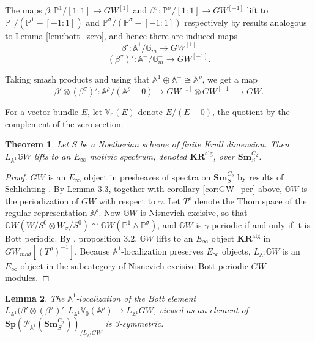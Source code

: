 \documentclass[edeposit,fullpage]{uiucthesis2009}
\newcommand{\mbb}{\mathbb}
\newcommand{\mc}{\mathcal}
\newcommand{\Sm}[1]{\mathbf{Sm}_{#1}}
\newcommand{\Sp}{\mathbf{Sp}}
\newcommand{\KR}{\mathbf{KR}^{\mathrm{alg}}}
\theoremstyle{plain}
\newtheorem{lemma}{Lemma}
\numberwithin{lemma}{section}
\newtheorem{theorem}[lemma]{Theorem}
\theoremstyle{definition}
\begin{document}
The maps $\beta :  \mbb P^1/[1:1] \rightarrow GW^{[1]}$ and
$\beta^\sigma : \mbb P^\sigma/[1:1] \rightarrow GW^{[-1]}$ lift to
$\mbb P^1/(\mbb P^1 - [-1:1])$ and $\mbb P^\sigma/(\mbb P^\sigma -
[-1:1])$ respectively by results analogous to Lemma
\ref{lem:bott_zero}, and hence there are induced maps 
\[
\beta' : \mbb A^1/\mbb G_m \rightarrow GW^{[1]}
\]
\[
(\beta^\sigma)' : \mbb A^-/\mbb G_m^- \rightarrow GW^{[-1]}.
\]

Taking smash products and using that $\mbb A^1 \oplus \mbb A^- \cong
\mbb A^\rho$, we get a map
\[
\beta' \otimes (\beta^\sigma)' : \mbb
A^\rho/(\mbb A^\rho - 0) \rightarrow GW^{[1]} \otimes GW^{[-1]}
\rightarrow GW.
\]

For a vector bundle $E$, let $\mbb V_0(E)$ denote $E/(E-0)$, the
quotient by the complement of the zero section.

\begin{theorem}\label{thm:GW_Einfty}
Let $S$ be a Noetherian scheme of finite Krull dimension. Then $L_{\mbb A^1}\mbb GW$ lifts to an $E_\infty$ motivic spectrum, denoted
$\KR$, over $\Sm{S}^{C_2}$.
\end{theorem}

\begin{proof}
$GW$ is an $E_\infty$ object in presheaves of spectra on
$\Sm{S}^{C_2}$ by results of Schlichting \cite{Schder}. By
\cite{cdhdesc} Lemma 3.3, together with corollary \ref{cor:GW_per}
above, $\mbb GW$ is the periodization of $GW$ with respect to
$\gamma$. Let $T^\rho$ denote the Thom space of the regular
representation $\mbb A^\rho$. Now $\mbb GW$ is Nisnevich excisive, so that $\mbb GW(W/S^0
\otimes W_\sigma/S^0) \cong \mbb GW(\mbb P^1 \wedge \mbb P^\sigma)$, and $\mbb GW$ is
$\gamma$ periodic if and only if it is Bott periodic. By \cite{cdhdesc}, proposition 3.2, $\mbb GW$ lifts to an
$E_\infty$ object $\KR$ in $GW_{mod}[(T^\rho)^{-1}]$. Because $\mbb A^1$-localization preserves
$E_\infty$ objects, $L_{\mbb A^1}\mbb GW$ is an $E_\infty$ object in
the subcategory of Nisnevich excisive Bott periodic
$GW$-modules. 
\end{proof}

\begin{lemma}\label{lem:bott_3symm}
The $\mbb A^1$-localization of the Bott element $L_{\mbb A^1}(\beta'
\otimes (\beta^\sigma)' : L_{\mbb A^1} \mbb V_0(\mbb A^\rho)
\rightarrow L_{\mbb A^1} GW$, viewed as an element of $\Sp(\mc P_{\mbb
  A^1}(\Sm{S}^{C_2}))_{/L_{\mbb A^1}GW}$ is 3-symmetric.
\end{lemma}
\end{document}
